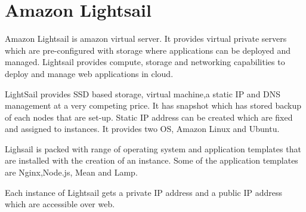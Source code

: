 \section{Amazon Lightsail}

Amazon Lightsail is amazon virtual server. It provides virtual private servers
which are pre-configured with storage where applications can be deployed
and managed. Lightsail provides compute, storage and networking capabilities
to deploy and manage web applications in cloud.

LightSail provides SSD based storage, virtual machine,a static IP and DNS
management at a very competing price. It has snapshot which has stored backup
of each nodes that are set-up. Static IP address can be created which are fixed
and assigned to instances. It provides two OS, Amazon Linux and Ubuntu.

Lighsail is packed with range of operating system and application templates
that are installed with the creation of an instance. Some of the application
templates are Nginx,Node.js, Mean and Lamp.

Each instance of Lightsail gets a private IP address and a public IP address
which are accessible over web.~\cite{hid-sp18-522-lightsail}



